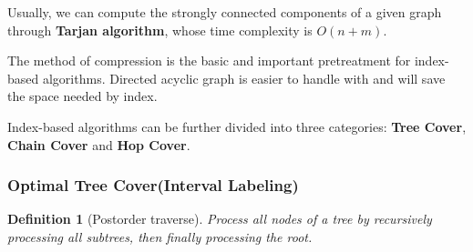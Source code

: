 \documentclass[11pt]{article}
\newtheorem{definition}[theorem]{Definition}
\begin{document}
Usually, we can compute the strongly connected components of a given graph through \textbf{Tarjan algorithm}, whose time complexity is $O(n+m)$.

The method of compression is the basic and important pretreatment for index-based algorithms. Directed acyclic graph is easier to handle with and will save the space needed by index.

Index-based algorithms can be further divided into three categories: \textbf{Tree Cover}, \textbf{Chain Cover} and \textbf{Hop Cover}.

\subsubsection{Optimal Tree Cover(Interval Labeling)}
\begin{definition} 	[Postorder traverse] 	Process all nodes of a tree by recursively processing all subtrees, then finally processing the root.
\end{definition}
\end{document}
